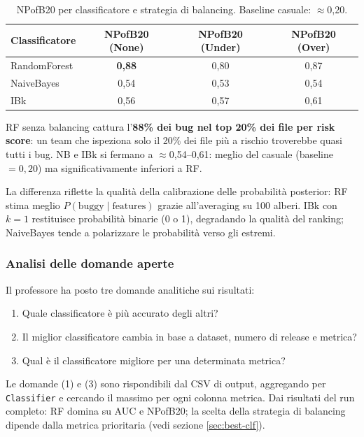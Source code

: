 \begin{table}[h!]
\centering
\small
\begin{tabular}{@{}lccc@{}}
\toprule
\textbf{Classificatore} & \textbf{NPofB20 (None)} & \textbf{NPofB20 (Under)} &
\textbf{NPofB20 (Over)} \\
\midrule
RandomForest & \textbf{0,88} & 0,80 & 0,87 \\
NaiveBayes   & 0,54          & 0,53 & 0,54 \\
IBk          & 0,56          & 0,57 & 0,61 \\
\bottomrule
\end{tabular}
\caption{NPofB20 per classificatore e strategia di balancing. Baseline casuale: $\approx$0,20.}
\end{table}

RF senza balancing cattura l'\textbf{88\% dei bug nel top 20\% dei file per risk score}:
un team che ispeziona solo il 20\% dei file più a rischio troverebbe quasi tutti i bug.
NB e IBk si fermano a $\approx$0,54--0,61: meglio del casuale (baseline $= 0{,}20$) ma
significativamente inferiori a RF.

La differenza riflette la qualità della calibrazione delle probabilità posterior: RF stima
meglio $P(\text{buggy} \mid \text{features})$ grazie all'averaging su 100 alberi. IBk con
$k=1$ restituisce probabilità binarie (0 o 1), degradando la qualità del ranking; NaiveBayes
tende a polarizzare le probabilità verso gli estremi.

\subsubsection{Analisi delle domande aperte}

Il professore ha posto tre domande analitiche sui risultati:

\begin{enumerate}
\item Quale classificatore è più accurato degli altri?
\item Il miglior classificatore cambia in base a dataset, numero di release e metrica?
\item Qual è il classificatore migliore per una determinata metrica?
\end{enumerate}

Le domande (1) e (3) sono rispondibili dal CSV di output, aggregando per
\texttt{Classifier} e cercando il massimo per ogni colonna metrica. Dai risultati del run
completo: RF domina su AUC e NPofB20; la scelta della strategia di balancing dipende
dalla metrica prioritaria (vedi sezione \ref{sec:best-clf}).

